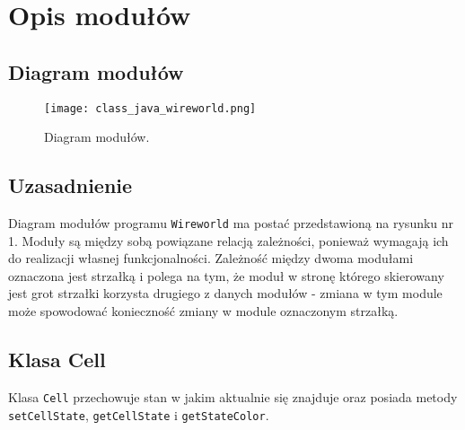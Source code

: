 \documentclass[a4paper,12pt,oneside]{article}
\begin{document}
\newpage
\section{Opis modułów}

\subsection{Diagram modułów}

\begin{figure}[ht]
\centering
\texttt{[image: class\_java\_wireworld.png]}
\caption{Diagram modułów.}
\label{fig:k1}
\end{figure}

\subsection{Uzasadnienie}
Diagram modułów programu \verb+Wireworld+ ma postać przedstawioną na rysunku nr 1. Moduły są między sobą powiązane relacją zależności, ponieważ wymagają ich do realizacji własnej funkcjonalności. Zależność między dwoma modułami oznaczona jest strzałką i polega na tym, że moduł w stronę którego skierowany jest grot strzałki korzysta drugiego z danych modułów - zmiana w tym module może spowodować konieczność zmiany w module oznaczonym strzałką.

\subsection{Klasa Cell}

Klasa \verb+Cell+ przechowuje stan w jakim aktualnie się znajduje oraz posiada metody \verb+setCellState+, \verb+getCellState+ i \verb+getStateColor+.
\end{document}
